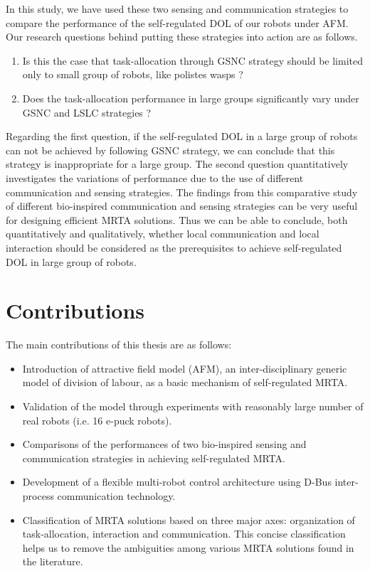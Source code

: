 In this study, we have used these two sensing and communication strategies to compare the performance of the self-regulated DOL of our robots under AFM. %
Our research questions behind putting these strategies into action are as follows.
\begin{enumerate}
\item Is this the case that task-allocation through GSNC strategy should be limited only to  small group of robots, like polistes wasps ?
\item 
Does the task-allocation performance  in large groups  significantly vary under GSNC and LSLC strategies ?
\end{enumerate}
Regarding the first question, if the self-regulated DOL in a large group of robots can not be achieved by following GSNC strategy, we can  conclude that this strategy is inappropriate for a large group. The second question quantitatively investigates the variations of performance due to the use of different  communication and sensing strategies.
The findings from this  comparative study of different bio-inspired  communication and sensing strategies can be very useful  for designing efficient MRTA solutions. Thus we can be able to conclude, both quantitatively and qualitatively, whether local communication and local interaction should be considered as the prerequisites to achieve self-regulated DOL in large group of robots.
\section{Contributions}
The main contributions of this thesis are as follows:
\begin{itemize}
\item Introduction of attractive field model (AFM), an  inter-disciplinary generic model of division of labour, as a basic mechanism of  self-regulated MRTA.
\item Validation of the model through experiments with reasonably large number of real robots (i.e. 16 e-puck robots).
\item Comparisons of the performances of two bio-inspired sensing and communication strategies in achieving self-regulated MRTA.
\item Development of a flexible multi-robot control architecture using D-Bus inter-process communication technology.
\item Classification of MRTA solutions based on three major axes: organization of task-allocation, interaction and communication. This concise classification helps us to remove the ambiguities among various MRTA solutions found in the literature. 
\end{itemize}
